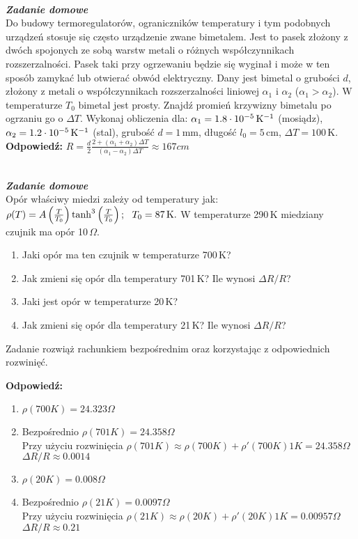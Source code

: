 \documentclass[11pt,a4paper]{article}
\newcounter{zaddom}\newcommand{\zaddom}[1][]{\addtocounter{zaddom}{1} ~\\  {\bf \emph{Zadanie domowe \arabic{zaddom} #1 }} \\}
\begin{document}
\zaddom
Do budowy termoregulatorów, ograniczników temperatury i tym
podobnych urządzeń stosuje się często urządzenie zwane bimetalem.
Jest to pasek złożony z dwóch spojonych ze sobą warstw metali
o różnych współczynnikach rozszerzalności.
Pasek taki przy ogrzewaniu będzie się wyginał i może
w ten sposób zamykać lub otwierać obwód elektryczny.
Dany jest bimetal o grubości $d$, złożony z metali
o współczynnikach rozszerzalności liniowej $\alpha_1$ i $\alpha_2$
($\alpha_1 > \alpha_2$).
W temperaturze $T_0$ bimetal jest prosty.
Znajdź promień krzywizny bimetalu po ogrzaniu go o $\Delta T$.
Wykonaj obliczenia dla: $\alpha_1=1.8\cdot 10^{-5}\,{\rm K}^{-1}$ (mosiądz),
$\alpha_2=1.2\cdot 10^{-5}\,{\rm K}^{-1}$ (stal), grubość $d=1\,$mm,
długość $l_0=5\,$cm, $\Delta T=100\,$K.
\vskip 10pt
\textbf{Odpowiedź:}
$R = \frac{d}{2} \frac{2+(\alpha_1+\alpha_2)\Delta T}{(\alpha_1-\alpha_2)\Delta T} \approx 167 cm$

\zaddom
Opór właściwy miedzi zależy od temperatury jak:
$ \rho(T) = 
  A \left(\frac{T}{T_0}\right) \tanh^3 \left(\frac{T}{T_0}\right);
  ~~ T_0 = 87\,\rm{K}. 
$
W temperaturze 290\,K miedziany czujnik ma opór 10\,$\Omega$. 
\begin{enumerate}
\item Jaki opór ma ten czujnik w temperaturze 700\,K? 
\item Jak zmieni się opór dla temperatury 701\,K? Ile wynosi $\Delta R/R$? 
\item Jaki jest opór w temperaturze 20\,K?
\item Jak zmieni się opór dla temperatury 21\,K? Ile wynosi  $\Delta R/R$?
\end{enumerate}
Zadanie rozwiąż rachunkiem bezpośrednim oraz korzystając z odpowiednich rozwinięć.

\vskip 10pt
\textbf{Odpowiedź:}
\begin{enumerate}
\item $\rho(700 K) = 24.323 \Omega$
\item Bezpośrednio $\rho(701 K) = 24.358 \Omega$\\
 Przy użyciu rozwinięcia $\rho(701 K) \approx \rho(700 K) + \rho'(700 K) 1 K = 24.358 \Omega$\\
 $\Delta R/R \approx 0.0014$
\item $\rho(20 K) = 0.008 \Omega$
\item Bezpośrednio $\rho(21 K) = 0.0097 \Omega$\\
 Przy użyciu rozwinięcia $\rho(21 K) \approx \rho(20 K) + \rho'(20 K) 1 K = 0.00957 \Omega$\\
 $\Delta R/R \approx 0.21$
\end{enumerate}
\end{document}
